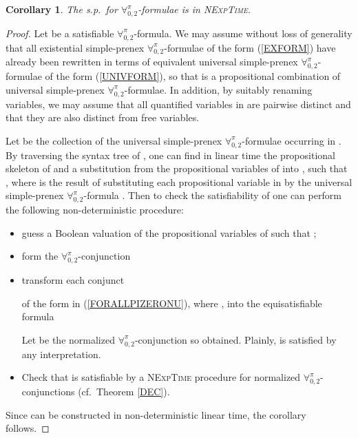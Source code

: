 \documentclass[submission,copyright,creativecommons]{eptcs}
\newtheorem{corollary}{Corollary}
\newcommand{\Lang}{\ensuremath{\mathbf{\forall}^{\pi}_{0,2}}\xspace}
\begin{document}
\begin{corollary}
    \label{corollaryLangFormulae}
    The s.p.\ for \Lang-formulae is in \textsc{NExpTime}.
\end{corollary}
\begin{proof}
Let  be a satisfiable \Lang-formula.  We may assume without
loss of generality that all existential simple-prenex \Lang-formulae
of the form (\ref{EXFORM}) have already been rewritten in terms of
equivalent universal simple-prenex \Lang-formulae of the form
(\ref{UNIVFORM}), so that  is a propositional combination of
universal simple-prenex \Lang-formulae.  In addition, by suitably
renaming variables, we may assume that all quantified variables in
 are pairwise distinct and that they are also distinct from
free variables.

Let  be the collection of
the universal simple-prenex \Lang-formulae occurring in .  By
traversing the syntax tree of , one can find in linear time
the propositional skeleton  of  and a
substitution  from the propositional variables
 of  into
, such that , where
 is the result of substituting each propositional
variable  in  by the universal
simple-prenex \Lang-formula .  Then to check
the satisfiability of  one can perform the following
non-deterministic procedure:
\begin{itemize}
    \item guess a Boolean valuation  of the propositional 
    variables  of 
     such that ;
    
    \item form the \Lang-conjunction
    
    
    \item transform each conjunct 
    
    of the form  in
    (\ref{FORALLPIZERONU}), where , into
    the equisatisfiable formula
    
Let  be the
    normalized \Lang-conjunction so obtained. Plainly,  is satisfied by any interpretation.
        


    \item Check that  is satisfiable by a 
    \textsc{NExpTime} procedure for normalized \Lang-conjunctions 
    (cf.\ Theorem \ref{DEC}).
\end{itemize}
Since  can be constructed in non-deterministic linear time, 
the corollary follows.
\end{proof}
\end{document}
